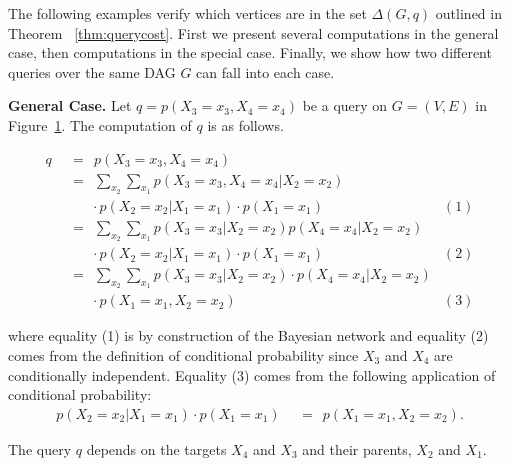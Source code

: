 
\null \quad \quad The following examples verify which vertices are in the set $\Delta(G,q)$ outlined in Theorem ~\ref{thm:querycost}. First we present several computations in the general case, then computations in the special case. Finally, we show how two different queries over the same DAG $G$ can fall into each case. 

\begin{example}\label{ex:qe2}

\textbf{General Case.} Let $q = p(X_{3} = x_{3}, X_{4} = x_{4})$ be a query on $G = (V,E)$ in Figure~\ref{fig:qe2}. The computation of $q$ is as follows.
 
 \begin{figure}[h!]
\centering
\begin{center}
\end{center}
\caption{}
\label{fig:qe2}
\end{figure}
 
\begin{align*}
 q 	& \ \ = \ \  p(X_{3} = x_{3}, X_{4} = x_{4}) \\[1em]
	& \ \ = \ \ \sum_{x_{2}} \sum_{x_{1}} p(X_{3}=x_{3},X_{4}=x_{4}|X_{2}=x_{2}) \\[1em] 
		& \quad \quad \cdot p(X_{2}=x_{2}|X_{1}=x_{1}) \cdot p(X_{1}=x_{1}) & (1)\\[1em] 
	& \ \ = \ \ \sum_{x_{2}} \sum_{x_{1}} p(X_{3}=x_{3}|X_{2}=x_{2})p(X_{4}=x_{4}|X_{2}=x_{2}) \\[1em] 
		& \quad \quad  \cdot p(X_{2}=x_{2}|X_{1}=x_{1}) \cdot p(X_{1}=x_{1}) & (2)\\[1em] 
	& \ \ = \ \ \sum_{x_{2}} \sum_{x_{1}} p(X_{3}=x_{3}|X_{2}=x_{2}) \cdot p(X_{4}=x_{4}|X_{2}=x_{2}) \\[1em]  
		& \quad \quad \cdot p(X_{1}=x_{1}, X_{2}=x_{2}) & (3)
\end{align*}

where equality (1) is by construction of the Bayesian network and equality (2) comes from the definition of conditional probability since $X_{3}$ and $X_{4}$ are conditionally independent. Equality (3) comes from the following application of conditional probability:
\begin{align*}
p(X_{2}=x_{2}| X_{1}=x_{1}) \cdot p(X_{1}=x_{1})	& \ \ = \ \  p(X_{1}=x_{1}, X_{2} = x_{2}). 
\end{align*}

The query $q$ depends on the targets $X_{4}$ and $X_{3}$ and their parents, $X_{2}$ and $X_{1}$. 

\end{example}
